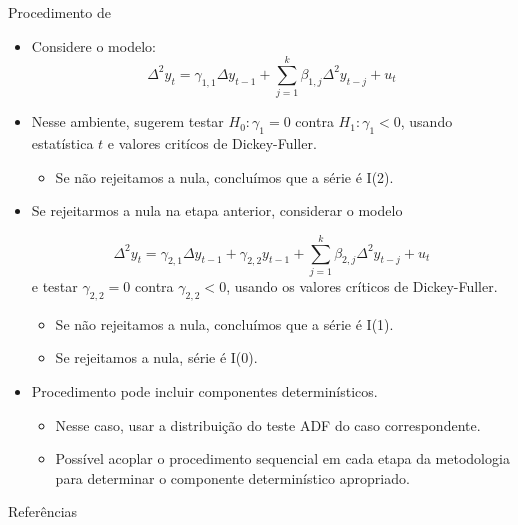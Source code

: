 \documentclass[11pt]{beamer}
\begin{document}
\begin{frame}{Procedimento de \citet{Dickey1987}}
	\begin{itemize}
		\small 
		\item Considere o modelo:
		\begin{equation*}
			\Delta^2 y_t = \gamma_{1,1} \Delta y_{t-1} + \sum_{j=1}^{k} \beta_{1,j} \Delta^2 y_{t-j} + u_t
		\end{equation*}
		\item Nesse ambiente, \citet{Dickey1987} sugerem testar $H_0: \gamma_1 = 0 $ contra $H_1: \gamma_1 < 0$, usando estatística $t$ e valores critícos de Dickey-Fuller.
			\begin{itemize}
				\item Se não rejeitamos a nula, concluímos que a série é I(2).
			\end{itemize}
		\item Se rejeitarmos a nula na etapa anterior, considerar o modelo
		
				\begin{equation*}
			\Delta^2 y_t =\gamma_{2,1} \Delta y_{t-1} + \gamma_{2,2} y_{t-1} +  \sum_{j=1}^{k} \beta_{2,j} \Delta^2 y_{t-j} +  u_t
		\end{equation*}
		e testar $\gamma_{2,2}=0$ contra $\gamma_{2,2} < 0$, usando os valores críticos de Dickey-Fuller.
		\vspace{-1em}
		\begin{itemize}
			\item Se não rejeitamos a nula, concluímos que a série é I(1).
			\item Se rejeitamos a nula, série é I(0).
		\end{itemize}
		\item Procedimento pode incluir componentes determinísticos.
		\begin{itemize}
			\item Nesse caso, usar a distribuição do teste ADF do caso correspondente.
			\item Possível acoplar o procedimento sequencial em cada etapa da metodologia para determinar o componente determinístico apropriado.
		\end{itemize}
	\end{itemize}
\end{frame}


\begin{frame}[allowframebreaks]{Referências}
	\printbibliography
\end{frame}
\end{document}
